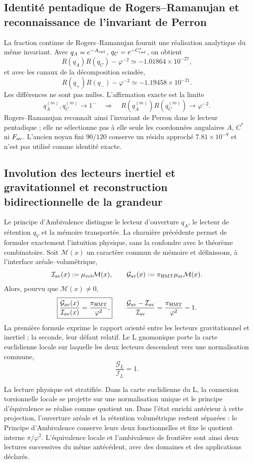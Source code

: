 \subsection{Identité pentadique de Rogers--Ramanujan et reconnaissance de l'invariant de Perron}

La fraction continue de Rogers--Ramanujan fournit une réalisation
analytique du même invariant. Avec
\(q_A=e^{-A_{\rm rad}}\), \(q_C=e^{-C^*_{\rm rad}}\), on obtient
\[
 R(q_A)R(q_C)-\varphi^{-2}\simeq-1.01864\times10^{-27},
\]
et avec les canaux de la décomposition scindée,
\[
 R(q_+)R(q_-)-\varphi^{-2}\simeq-1.19458\times10^{-21}.
\]
Les différences ne sont pas nulles. L'affirmation exacte est la limite
\[
 q_A^{(m)},q_C^{(m)}\to1^-
 \quad\Longrightarrow\quad
 R(q_A^{(m)})R(q_C^{(m)})\to\varphi^{-2}.
\]
Rogers--Ramanujan reconnaît ainsi l'invariant de Perron dans le lecteur
pentadique ; elle ne sélectionne pas à elle seule les coordonnées angulaires \(A\), \(C^*\) ni
\(F_{\rm av}\). L'ancien noyau fini \(90/120\) conserve un résidu
approché \(7.81\times10^{-9}\) et n'est pas utilisé comme identité exacte.

\subsection{Involution des lecteurs inertiel et gravitationnel et reconstruction bidirectionnelle de la grandeur}

Le principe d'Ambivalence distingue le lecteur d'ouverture
\(q_A\), le lecteur de rétention \(q_V\) et la mémoire transportée. La
charnière précédente permet de formuler exactement l'intuition physique, sans
la confondre avec le théorème combinatoire. Soit \(\mathcal M(x)\) un caractère
commun de mémoire et définissons, à l'interface aréale--volumétrique,
\[
 \mathcal I_{\rm av}(x)
 :=\mu_{\rm vol}\mathcal M(x),
 \qquad
 \mathcal G_{\rm av}(x)
 :=\pi_{\rm HMT}\mu_{\rm ar}\mathcal M(x).
\]
Alors, pourvu que \(\mathcal M(x)\ne0\),
\[
 \boxed{
 \frac{\mathcal G_{\rm av}(x)}{\mathcal I_{\rm av}(x)}
 =\frac{\pi_{\rm HMT}}{\varphi^2},}
 \qquad
 \frac{\mathcal G_{\rm av}-\mathcal I_{\rm av}}
 {\mathcal I_{\rm av}}
 =\frac{\pi_{\rm HMT}}{\varphi^2}-1.
\]
La première formule exprime le rapport orienté entre les lecteurs
gravitationnel et inertiel ; la seconde, leur défaut relatif. Le L gnomonique
porte la carte euclidienne locale sur laquelle les deux lecteurs descendent vers une
normalisation commune,
\[
 \frac{\mathcal G_{L}}{\mathcal I_{L}}=1.
\]

La lecture physique est stratifiée. Dans la carte euclidienne du L, la
connexion torsionnelle locale se projette sur une normalisation unique et le
principe d'équivalence se réalise comme quotient un. Dans l'état
enrichi antérieur à cette projection, l'ouverture aréale et la rétention
volumétrique restent séparées : le Principe d'Ambivalence conserve leurs
deux fonctionnelles et fixe le quotient interne \(\pi/\varphi^2\). L'équivalence
locale et l'ambivalence de frontière sont ainsi deux lectures successives du
même antécédent, avec des domaines et des applications déclarés.

